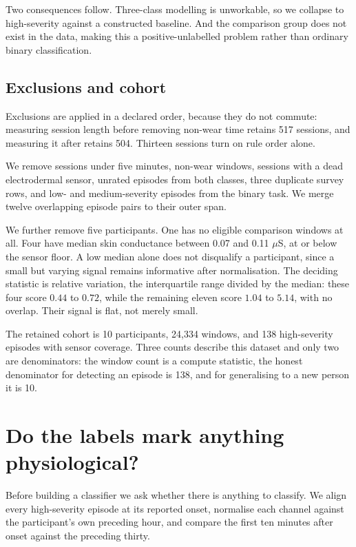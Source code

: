 \documentclass{article}
\begin{document}
Two consequences follow. Three-class modelling is unworkable, so we collapse to
high-severity against a constructed baseline. And the comparison group does not
exist in the data, making this a positive-unlabelled problem \cite{elkan2008}
rather than ordinary binary classification.

\subsection{Exclusions and cohort}

Exclusions are applied in a declared order, because they do not commute:
measuring session length before removing non-wear time retains 517 sessions,
and measuring it after retains 504. Thirteen sessions turn on rule order alone.

We remove sessions under five minutes, non-wear windows, sessions with a dead
electrodermal sensor, unrated episodes from both classes, three duplicate
survey rows, and low- and medium-severity episodes from the binary task. We
merge twelve overlapping episode pairs to their outer span.

We further remove five participants. One has no eligible comparison windows at
all. Four have median skin conductance between 0.07  and
0.11 $\mu$S, at or below the sensor floor. A low median alone
does not disqualify a participant, since a small but varying signal remains
informative after normalisation. The deciding statistic is relative variation,
the interquartile range divided by the median: these four score $0.44$ to
$0.72$, while the remaining eleven score $1.04$ to $5.14$, with no overlap.
Their signal is flat, not merely small.

The retained cohort is 10 participants, 24{,}334 windows, and 138
high-severity episodes with sensor coverage. Three counts describe this dataset
and only two are denominators: the window count is a compute statistic, the
honest denominator for detecting an episode is 138, and for generalising to a
new person it is 10.

\section{Do the labels mark anything physiological?}
\label{sec:labels}

Before building a classifier we ask whether there is anything to classify. We
align every high-severity episode at its reported onset, normalise each channel
against the participant's own preceding hour, and compare the first ten minutes
after onset against the preceding thirty.
\end{document}
